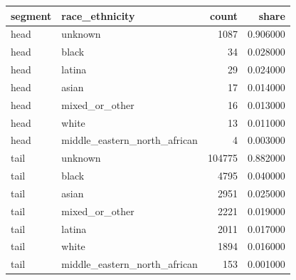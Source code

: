 \begin{tabular}{llrr}
\toprule
segment & race_ethnicity & count & share \\
\midrule
head & unknown & 1087 & 0.906000 \\
head & black & 34 & 0.028000 \\
head & latina & 29 & 0.024000 \\
head & asian & 17 & 0.014000 \\
head & mixed_or_other & 16 & 0.013000 \\
head & white & 13 & 0.011000 \\
head & middle_eastern_north_african & 4 & 0.003000 \\
tail & unknown & 104775 & 0.882000 \\
tail & black & 4795 & 0.040000 \\
tail & asian & 2951 & 0.025000 \\
tail & mixed_or_other & 2221 & 0.019000 \\
tail & latina & 2011 & 0.017000 \\
tail & white & 1894 & 0.016000 \\
tail & middle_eastern_north_african & 153 & 0.001000 \\
\bottomrule
\end{tabular}

